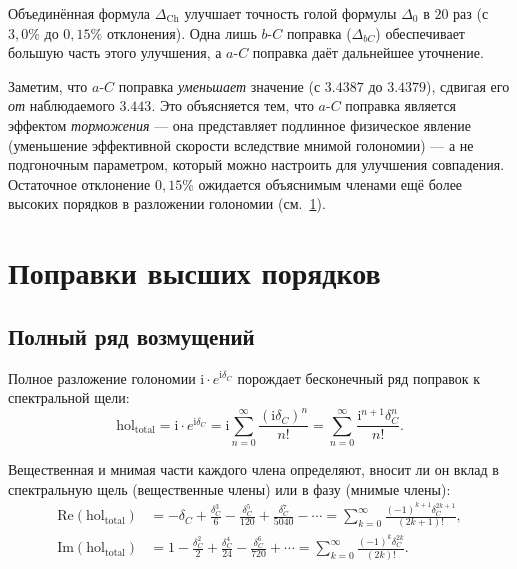 \documentclass[12pt,a4paper]{article}
\theoremstyle{definition}
\theoremstyle{remark}
\newcommand{\hol}{\mathrm{hol}}
\newcommand{\ii}{\mathrm{i}}
\begin{document}
Объединённая формула $\Delta_{\mathrm{Ch}}$ улучшает точность голой формулы $\Delta_0$ в $20$ раз (с $3{,}0\%$ до $0{,}15\%$ отклонения). Одна лишь $b$-$C$ поправка ($\Delta_{bC}$) обеспечивает большую часть этого улучшения, а $a$-$C$ поправка даёт дальнейшее уточнение.

Заметим, что $a$-$C$ поправка \emph{уменьшает} значение (с $3.4387$ до $3.4379$), сдвигая его \emph{от} наблюдаемого $3.443$. Это объясняется тем, что $a$-$C$ поправка является эффектом \emph{торможения} --- она представляет подлинное физическое явление (уменьшение эффективной скорости вследствие мнимой голономии) --- а не подгоночным параметром, который можно настроить для улучшения совпадения. Остаточное отклонение $0{,}15\%$ ожидается объяснимым членами ещё более высоких порядков в разложении голономии (см.\ \cref{sec:higher}).

\section{Поправки высших порядков}
\label{sec:higher}

\subsection{Полный ряд возмущений}

Полное разложение голономии $\ii \cdot e^{\ii\delta_C}$ порождает бесконечный ряд поправок к спектральной щели:
\begin{equation}
\hol_{\mathrm{total}} = \ii \cdot e^{\ii\delta_C} = \ii \sum_{n=0}^{\infty} \frac{(\ii\delta_C)^n}{n!} = \sum_{n=0}^{\infty} \frac{\ii^{n+1} \delta_C^n}{n!}.
\end{equation}

Вещественная и мнимая части каждого члена определяют, вносит ли он вклад в спектральную щель (вещественные члены) или в фазу (мнимые члены):
\begin{align}
\mathrm{Re}(\hol_{\mathrm{total}}) &= -\delta_C + \frac{\delta_C^3}{6} - \frac{\delta_C^5}{120} + \frac{\delta_C^7}{5040} - \cdots = \sum_{k=0}^{\infty} \frac{(-1)^{k+1} \delta_C^{2k+1}}{(2k+1)!}, \\
\mathrm{Im}(\hol_{\mathrm{total}}) &= 1 - \frac{\delta_C^2}{2} + \frac{\delta_C^4}{24} - \frac{\delta_C^6}{720} + \cdots = \sum_{k=0}^{\infty} \frac{(-1)^k \delta_C^{2k}}{(2k)!}.
\end{align}
\end{document}
